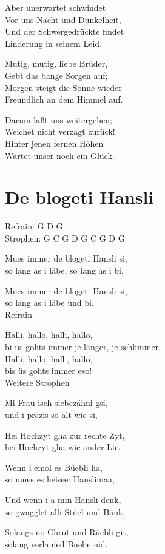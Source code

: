 \documentclass[
  letterpaper,
  twoside=false]{scrbook}
\begin{document}
Aber unerwartet schwindet\\
Vor uns Nacht und Dunkelheit,\\
Und der Schwergedrückte findet\\
Linderung in seinem Leid.

Mutig, mutig, liebe Brüder,\\
Gebt das bange Sorgen auf;\\
Morgen steigt die Sonne wieder\\
Freundlich an dem Himmel auf.

Darum laßt uns weitergehen;\\
Weichet nicht verzagt zurück!\\
Hinter jenen fernen Höhen\\
Wartet unser noch ein Glück.

\hypertarget{de-blogeti-hansli}{%
\chapter{De blogeti Hansli}\label{de-blogeti-hansli}}

Refrain: G D G\\
Strophen: G C G D G C G D G

Mues immer de blogeti Hansli si,\\
so lang as i läbe, so lang as i bi.

Mues immer de blogeti Hansli si,\\
so lang as i läbe und bi.\\
Refrain

Halli, hallo, halli, hallo,\\
bi üs gohts immer je länger, je schlimmer.\\
Halli, hallo, halli, hallo,\\
bis üs gohts immer eso!\\
Weitere Strophen

Mi Frau isch siebezähni gsi,\\
und i prezis so alt wie si,

Hei Hochzyt gha zur rechte Zyt,\\
hei Hochzyt gha wie ander Lüt.

Wenn i emol es Büebli ha,\\
so mues es heisse: Hanslimaa,

Und wenn i a min Hansli denk,\\
so gwagglet alli Stüel und Bänk.

Solangs no Chrut und Rüebli git,\\
solang verlaufed Buebe nid.
\end{document}
